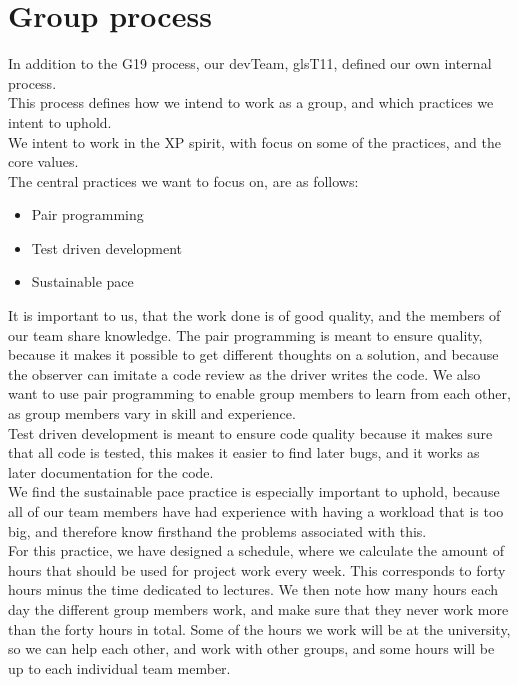 \section{Group process}

In addition to the \gls{G19} process, our \gls{devTeam}, gls{T11}, defined our own internal process.\\
This process defines how we intend to work as a group, and which practices we intent to uphold. \\

We intent to work in the \gls{XP} spirit, with focus on some of the practices, and the core values.\\
The central practices we want to focus on, are as follows:
\begin{itemize}
    \item Pair programming 
    \item Test driven development
    \item Sustainable pace
\end{itemize}

It is important to us, that the work done is of good quality, and the members of our team share knowledge. The pair programming is meant to ensure quality, because it makes it possible to get different thoughts on a solution, and because the observer can imitate a code review as the \gls{driver} writes the code. We also want to use pair programming to enable group members to learn from each other, as group members vary in skill and experience.\\
Test driven development is meant to ensure code quality because it makes sure that all code is tested, this makes it easier to find later bugs, and it works as later documentation for the code.\\
We find the sustainable pace practice is especially important to uphold, because all of our team members have had experience with having a workload that is too big, and therefore know firsthand the problems associated with this.\\
For this practice, we have designed a schedule, where we calculate the amount of hours that should be used for project work every week. This corresponds to forty hours minus the time dedicated to lectures. We then note how many hours each day the different group members work, and make sure that they never work more than the forty hours in total. Some of the hours we work will be at the university, so we can help each other, and work with other groups, and some hours will be up to each individual team member.\\

